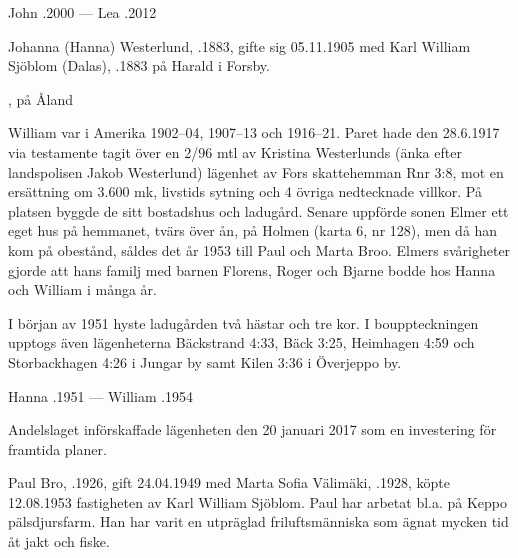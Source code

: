 John .2000  ---  Lea .2012


\jhvspace{}


Johanna (Hanna) Westerlund, .1883, gifte sig 05.11.1905 med Karl William Sjöblom (Dalas), .1883 på Harald i Forsby.
\begin{jhchildren}
  \item {}
  \item {}
  \item {}
  \item {}, på Åland
  \item {}
\end{jhchildren}

William var i Amerika 1902--04, 1907--13 och 1916--21. Paret hade den 28.6.1917 via testamente tagit över en 2/96 mtl av Kristina 	Westerlunds (änka efter landspolisen Jakob Westerlund) lägenhet av Fors skattehemman Rnr 3:8, mot en ersättning om 3.600 mk, livstids sytning och 4 övriga nedtecknade villkor. På platsen byggde de sitt bostadshus och ladugård. Senare uppförde sonen Elmer ett eget hus på hemmanet, tvärs över ån, på Holmen (karta 6, nr 128), men då han kom på obestånd, såldes det år 1953 till Paul och Marta Broo. Elmers svårigheter gjorde att hans familj med barnen Florens, Roger och Bjarne bodde hos Hanna och William i många år.

I början av 1951 hyste ladugården två hästar och tre kor. I bouppteckningen upptogs även lägenheterna Bäckstrand 4:33, Bäck 3:25, Heimhagen 4:59 och Storbackhagen 4:26 i Jungar by samt Kilen 3:36 i Överjeppo by.

Hanna .1951  --- 	William .1954





Andelslaget införskaffade lägenheten den 20 januari 2017 som en investering för framtida planer.\jhvspace{}



Paul Bro, .1926, gift 24.04.1949 med Marta Sofia Välimäki, .1928, köpte 12.08.1953 fastigheten av Karl William Sjöblom. Paul har arbetat bl.a. på Keppo pälsdjursfarm. Han har varit en utpräglad friluftsmänniska som ägnat mycken tid åt jakt och fiske.

